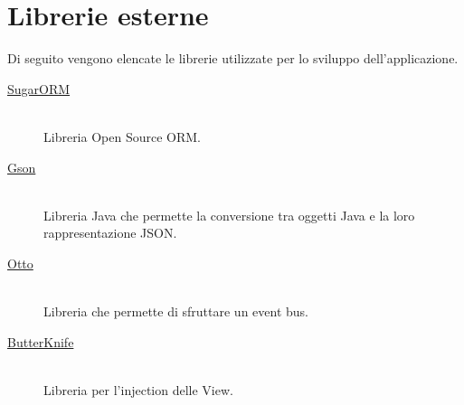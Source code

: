 


\section{Librerie esterne}
Di seguito vengono elencate le librerie utilizzate per lo sviluppo dell'applicazione.

\begin{description}

\item[\href{http://satyan.github.io/sugar}{SugarORM}] \hfill \\
Libreria Open Source ORM.

\item[\href{https://code.google.com/p/google-gson/}{Gson}] \hfill \\
Libreria Java che permette la conversione tra oggetti Java e la loro rappresentazione JSON.

\item[\href{http://square.github.io/otto/}{Otto}] \hfill \\
Libreria che permette di sfruttare un event bus.

\item[\href{https://github.com/JakeWharton/butterknife}{ButterKnife}] \hfill \\
Libreria per l'injection delle View.
\end{description}
